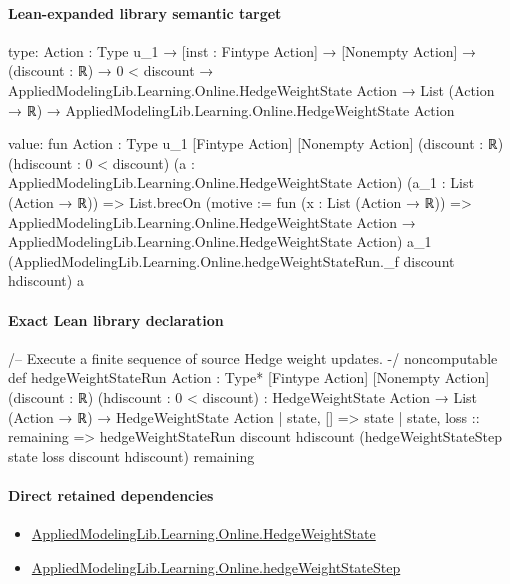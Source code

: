\documentclass[10pt]{article}
\begin{document}
\paragraph{Lean-expanded library semantic target}
\begin{ReviewVerbatim}
type:
{Action : Type u_1} →
  [inst : Fintype Action] →
    [Nonempty Action] →
      (discount : ℝ) →
        0 < discount →
          AppliedModelingLib.Learning.Online.HedgeWeightState Action →
            List (Action → ℝ) → AppliedModelingLib.Learning.Online.HedgeWeightState Action

value:
fun {Action : Type u_1} [Fintype Action] [Nonempty Action] (discount : ℝ) (hdiscount : 0 < discount)
    (a : AppliedModelingLib.Learning.Online.HedgeWeightState Action) (a_1 : List (Action → ℝ)) =>
  List.brecOn (motive := fun (x : List (Action → ℝ)) =>
    AppliedModelingLib.Learning.Online.HedgeWeightState Action →
      AppliedModelingLib.Learning.Online.HedgeWeightState Action)
    a_1 (AppliedModelingLib.Learning.Online.hedgeWeightStateRun._f discount hdiscount) a
\end{ReviewVerbatim}

\paragraph{Exact Lean library declaration}
\begin{ReviewVerbatim}
/-- Execute a finite sequence of source Hedge weight updates. -/
noncomputable def hedgeWeightStateRun
    {Action : Type*} [Fintype Action] [Nonempty Action]
    (discount : ℝ) (hdiscount : 0 < discount) :
    HedgeWeightState Action → List (Action → ℝ) → HedgeWeightState Action
  | state, [] => state
  | state, loss :: remaining =>
      hedgeWeightStateRun discount hdiscount
        (hedgeWeightStateStep state loss discount hdiscount) remaining
\end{ReviewVerbatim}

\paragraph{Direct retained dependencies}
\begin{itemize}\raggedright
\item \hyperlink{library-prerequisite-8196082d02788389}{Applied\allowbreak{}Modeling\allowbreak{}Lib.\allowbreak{}Learning.\allowbreak{}Online.\allowbreak{}Hedge\allowbreak{}Weight\allowbreak{}State}
\item \hyperlink{governing-declaration-f4d506edff5447e0}{Applied\allowbreak{}Modeling\allowbreak{}Lib.\allowbreak{}Learning.\allowbreak{}Online.\allowbreak{}hedge\allowbreak{}Weight\allowbreak{}State\allowbreak{}Step}
\end{itemize}
\end{document}
